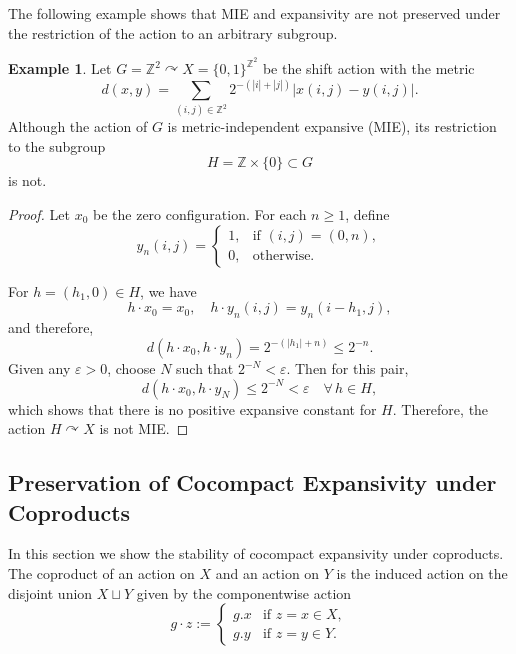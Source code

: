 \documentclass[12pt]{amsart}
\theoremstyle{plain}
\theoremstyle{definition}
\newtheorem{remark}[theorem]{Remark}
\newtheorem{example}[theorem]{Example}
\theoremstyle{remark}
\begin{document}
The following example shows that MIE and expansivity are not preserved under the restriction of the action to an arbitrary subgroup.

\begin{example}
Let \( G = \mathbb{Z}^2 \curvearrowright X = \{0,1\}^{\mathbb{Z}^2} \) be the shift action with the metric
\[
d(x, y) = \sum_{(i,j)\in\mathbb{Z}^2} 2^{-(|i|+|j|)} \bigl|x(i,j) - y(i,j)\bigr|.
\]
Although the action of \( G \) is metric-independent expansive (MIE), its restriction to the subgroup
\[
H = \mathbb{Z} \times \{0\} \subset G
\]
is not.
\end{example}
\begin{proof}
Let \( x_0 \) be the zero configuration. For each \( n \ge 1 \), define
\[
y_n(i,j) = \begin{cases}
1,& \text{if } (i,j) = (0,n),\\
0,& \text{otherwise.}
\end{cases}
\]

For \( h = (h_1, 0) \in H \), we have
\[
h \cdot x_0 = x_0, \quad h \cdot y_n(i,j) = y_n(i - h_1, j),
\]
and therefore,
\[
d(h \cdot x_0, h \cdot y_n) = 2^{-(|h_1| + n)} \le 2^{-n}.
\]
Given any \( \varepsilon > 0 \), choose \( N \) such that \( 2^{-N} < \varepsilon \). Then for this pair,
\[
d(h \cdot x_0, h \cdot y_N) \le 2^{-N} < \varepsilon \quad \forall\, h \in H,
\]
which shows that there is no positive expansive constant for \( H \). Therefore, the action \( H \curvearrowright X \) is not MIE.
\end{proof}


\subsection{Preservation of Cocompact Expansivity under Coproducts}

In this section we show the stability of cocompact expansivity under coproducts. The coproduct of an action on $X$ and an action on $Y$ is the induced action on the disjoint union $X\sqcup Y$ given by
the componentwise action
\[
g \cdot z :=
\begin{cases}
g.x & \text{if } z = x \in X, \\[2pt]
g.y & \text{if } z = y \in Y.
\end{cases}
\]
\end{document}
